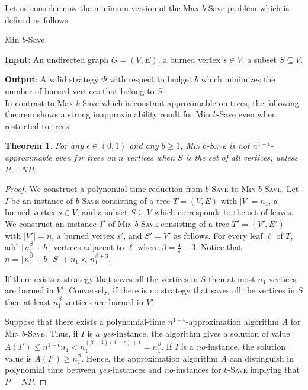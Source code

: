 \documentclass[10pt]{article}
\newcommand{\probtitle}[1]{\textsc{#1}}
\newtheorem{theorem}{Theorem}
\begin{document}
Let us consider now the minimum version of the {\sc Max $b$-Save} problem which is defined as follows. 

\medskip

\noindent 
{\sc Min $b$-Save}

\noindent\textbf{Input}: An undirected graph $G=(V,E)$, a burned vertex $s\in V$, a subset $S \subseteq V$.

\noindent\textbf{Output}: A valid strategy $\Phi$ with respect to budget $b$ which minimizes the number of burned vertices that belong to $S$.\\

In contrast to {\sc Max $b$-Save} which is constant approximable on trees, the following theorem shows a strong inapproximability result for {\sc Min $b$-Save} even when restricted to trees.


\begin{theorem}
For any $\epsilon \in (0,1)$ and any $b\geq 1$, \probtitle{Min $b$-Save} is not $n^{1-\epsilon}$-approximable 
even for trees on $n$ vertices when $S$ is the set of all vertices, unless $P=NP$.
\end{theorem}

\begin{proof}
We construct a polynomial-time reduction from \probtitle{$b$-Save} to \probtitle{Min $b$-Save}.
Let $I$ be an instance of \textsc{$b$-Save} consisting of a tree
$T=(V,E)$ with $|V| = n_1$, a burned vertex $s \in V$, and a subset $S \subseteq V$ which corresponds
to the set of leaves. We construct an instance $I'$ of
\textsc{Min $b$-Save} consisting of a tree $T'=(V', E')$ with $|V'|=n$, a burned vertex $s'$, and $S' = V'$ as follows. For every leaf $\ell$ of $T$, add $\lfloor n_1^{\beta}+b \rfloor$ vertices adjacent to $\ell$ where $\beta = \frac{4}{\epsilon}-3$. Notice that $n = \lfloor n_1^{\beta}+b \rfloor |S| + n_1 < n_1^{\beta + 3}$.

If there exists a strategy that saves all the vertices in $S$ then at most $n_1$ vertices are burned in $V'$. Conversely, if there is no strategy that saves all the vertices in $S$ then at least $n_1^{\beta}$ vertices are burned in $V'$. 

Suppose that there exists a polynomial-time $n^{1-\epsilon}$-approximation algorithm $A$ for \probtitle{Min $b$-Save}. Thus, if $I$ is a \textit{yes}-instance, the algorithm gives a solution of value $A(I') \leq n^{1-\epsilon}n_1 < n_1^{(\beta + 3)(1-\epsilon)+1} = n_1^{\beta}$.
If $I$ is a \textit{no}-instance, the solution value is $A(I') \geq n_1^{\beta}$. Hence, the approximation algorithm $A$ can distinguish in polynomial time between \textit{yes}-instances and \textit{no}-instances for \probtitle{$b$-Save} implying that $P=NP$.
\end{proof}
\end{document}
